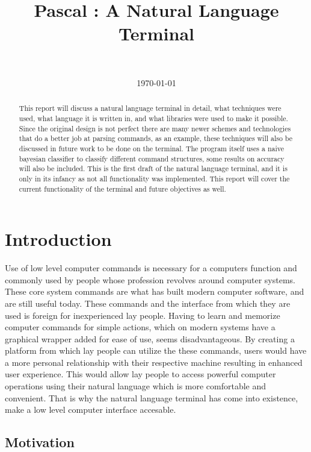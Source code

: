 \documentclass[12pt]{article}
\title{Pascal : A Natural Language Terminal}
\author{
  \IEEEauthorblockN{Eric Adamski}\\
  \IEEEauthorblockA{
    {\small School of Computer Science}\\
    {\small Carleton University}\\
    {\small Ottawa, Ontario, Canada}\\
    {\small Email: \{eric.adamski@cmail.carleton.ca\}}
  }
}
\date{\today}
\begin{document}
\maketitle

\begin{abstract}
  This report will discuss a natural language terminal in detail, what techniques were used, what language it is written in, and what libraries were used to make it possible. Since the original design is not perfect there are many newer schemes and technologies that do a better job at parsing commands, as an example, these techniques will also be discussed in future work to be done on the terminal. The program itself uses a naive bayesian classifier to classify different command structures, some results on accuracy will also be included. This is the first draft of the natural language terminal, and it is only in its infancy as not all functionality was implemented. This report will cover the current functionality of the terminal and future objectives as well.
\end{abstract}

\section{Introduction}

Use of low level computer commands is necessary for a computers function and commonly used by people whose profession revolves around computer systems. These core system commands are what has built modern computer software, and are still useful today. These commands and the interface from which they are used is foreign for inexperienced lay people. Having to learn and memorize computer commands for simple actions, which on modern systems have a graphical wrapper added for ease of use, seems disadvantageous. By creating a platform from which lay people can utilize the these commands, users would have a more personal relationship with their respective machine resulting in enhanced user experience. This would allow lay people to access powerful computer operations using their natural language which is more comfortable and convenient. That is why the natural language terminal has come into existence, make a low level computer interface accesable.

\subsection{Motivation}
\end{document}
